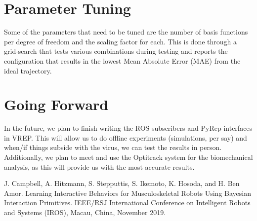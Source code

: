 \documentclass[letterpaper, 10 pt, conference]{ieeeconf}  %
\begin{document}
\section{Parameter Tuning}
Some of the parameters that need to be tuned are the number of basis functions per degree of freedom and the scaling factor for each. This is done through a grid-search that tests various combinations during testing and reports the configuration that results in the lowest Mean Absolute Error (MAE) from the ideal trajectory.

\section{Going Forward}
In the future, we plan to finish writing the ROS subscribers and PyRep interfaces in VREP. This will allow us to do offline experiments (simulations, per say) and when/if things subside with the virus, we can test the results in person. Additionally, we plan to meet and use the Optitrack system for the biomechanical analysis, as this will provide us with the most accurate results.

\addtolength{\textheight}{-12cm}   %








\begin{thebibliography}{99}
 J. Campbell, A. Hitzmann, S. Stepputtis, S. Ikemoto, K. Hosoda, and H. Ben Amor. Learning Interactive Behaviors for Musculoskeletal Robots Using Bayesian Interaction Primitives. IEEE/RSJ International Conference on Intelligent Robots and Systems (IROS), Macau, China, November 2019.
\end{thebibliography}
\end{document}
